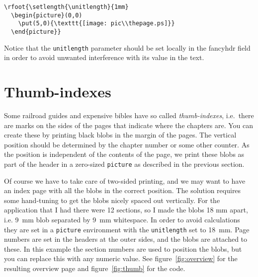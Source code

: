 \documentclass[a4paper]{article}
\newcommand{\bs}{\symbol{'134}}
\newcommand{\Cmd}[1]{\texttt{\def\{{\char`\{}\def\}{\char`\}}\bs#1}}
\begin{document}
\begin{verbatim}
\rfoot{\setlength{\unitlength}{1mm}
  \begin{picture}(0,0)
    \put(5,0){\texttt{[image: pic\\thepage.ps]}}
  \end{picture}}
\end{verbatim}

Notice that the \Cmd{unitlength} parameter should
be set locally in the fancyhdr field in order to avoid unwanted
interference with its value in the text.

\section{Thumb-indexes}
\label{sec:thumb}

Some railroad guides and expensive bibles have so called
\emph{thumb-indexes}, i.e.\ there are marks on the sides of the pages that
indicate where the chapters are. You can create these by printing black
blobs in the margin of the pages. The vertical position should be
determined by the chapter number or some other counter. As the position is
independent of the contents of the page, we print these blobs as part of
the header in a zero-sized \texttt{picture} as described in the previous
section.

Of course we have to take care of two-sided printing, and we may want to
have an index page with all the blobs in the correct position. The solution
requires some hand-tuning to get the blobs nicely spaced out vertically.
For the application that I had there were 12 sections, so I made the blobs
18 mm apart, i.e. 9~mm blob separated by 9~mm whitespace. In order to avoid
calculations they are set in a \texttt{picture} environment with the
\Cmd{unitlength} set to 18~mm. Page numbers are set in the headers at the
outer sides, and the blobs are attached to these. In this example the
section numbers are used to position the blobs, but you can replace this
with any numeric value. 
See figure~\ref{fig:overview} for the resulting
overview page and figure~\ref{fig:thumb} for the code.
\end{document}
